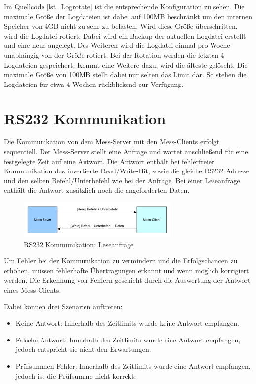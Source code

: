 Im Quellcode \ref{lst_Logrotate} ist die entsprechende Konfiguration zu sehen. Die maximale Größe der Logdateien ist dabei auf 100MB beschränkt um den internen Speicher von 4GB nicht zu sehr zu belasten. Wird diese Größe überschritten, wird die Logdatei rotiert. Dabei wird ein Backup der aktuellen Logdatei erstellt und eine neue angelegt. Des Weiteren wird die Logdatei einmal pro Woche unabhängig von der Größe rotiert. Bei der Rotation werden die letzten 4 Logdateien gespeichert. Kommt eine Weitere dazu, wird die älteste gelöscht. Die maximale Größe von 100MB stellt dabei nur selten das Limit dar. So stehen die Logdateien für etwa 4 Wochen rückblickend zur Verfügung.



\section{RS232 Kommunikation}

Die Kommunikation von dem Mess-Server mit den Mess-Clients erfolgt sequentiell. Der Mess-Server stellt eine Anfrage und wartet anschließend für eine festgelegte Zeit auf eine Antwort. Die Antwort enthält bei fehlerfreier Kommunikation das invertierte Read/Write-Bit, sowie die gleiche RS232 Adresse und den selben Befehl/Unterbefehl wie bei der Anfrage. Bei einer Leseanfrage enthält die Antwort zusätzlich noch die angeforderten Daten.\\

\begin{figure}[H]
\begin{center}
\includegraphics[width=0.7\textwidth ]{img/general/RS232Uebertragung.pdf}
\caption{RS232 Kommunikation: Leseanfrage}
\label{figure_RS232Kommunikation}
\end{center}
\end{figure}

Um Fehler bei der Kommunikation zu vermindern und die Erfolgschancen zu erhöhen, müssen fehlerhafte Übertragungen erkannt und wenn möglich korrigiert werden. Die Erkennung von Fehlern geschieht durch die Auswertung der Antwort eines Mess-Clients.

Dabei können drei Szenarien auftreten:
\begin{itemize}
\item Keine Antwort: Innerhalb des Zeitlimits wurde keine Antwort empfangen.
\item Falsche Antwort: Innerhalb des Zeitlimits wurde eine Antwort empfangen, jedoch entspricht sie nicht den Erwartungen.
\item Prüfsummen-Fehler: Innerhalb des Zeitlimits wurde eine Antwort empfangen, jedoch ist die Prüfsumme nicht korrekt.
\end{itemize}

